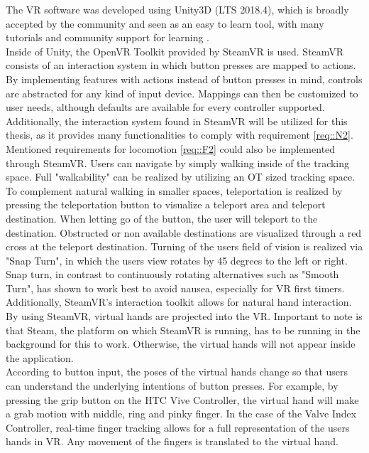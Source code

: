 The VR software was developed using Unity3D (LTS 2018.4), which is broadly accepted by the community and seen as an easy to learn tool, with many tutorials and community 
support for learning \cite{bartneck2015robot}.
\\ Inside of Unity, the OpenVR Toolkit provided by SteamVR is used.
SteamVR consists of an interaction system in which button presses are mapped to actions.
By implementing features with actions instead of button presses in mind, controls are abstracted for any kind of input device.
Mappings can then be customized to user needs, although defaults are available for every controller supported.
\\ Additionally, the interaction system found in SteamVR will be utilized for this thesis, as it provides many functionalities to comply with requirement \ref{req::N2}.
Mentioned requirements for locomotion \ref{req::F2} could also be implemented through SteamVR.
Users can navigate by simply walking inside of the tracking space.
Full "walkability" can be realized by utilizing an OT sized tracking space.
To complement natural walking in smaller spaces, teleportation is realized by pressing the teleportation button to visualize a teleport area and teleport destination.
When letting go of the button, the user will teleport to the destination.
Obstructed or non available destinations are visualized through a red cross at the teleport destination.
Turning of the users field of vision is realized via "Snap Turn", in which the users view rotates by 45 degrees to the left or right.
Snap turn, in contrast to continuously rotating alternatives such as "Smooth Turn", has shown to work best to avoid nausea, especially for VR first timers. 
\\ Additionally, SteamVR's interaction toolkit allows for natural hand interaction.
By using SteamVR, virtual hands are projected into the VR.
Important to note is that Steam, the platform on which SteamVR is running, has to be running in the background for this to work.
Otherwise, the virtual hands will not appear inside the application.
\\ According to button input, the poses of the virtual hands change so that users can understand the underlying intentions of button presses.
For example, by pressing the grip button on the HTC Vive Controller, the virtual hand will make a grab motion with middle, ring and pinky finger.
In the case of the Valve Index Controller, real-time finger tracking allows for a full representation of the users hands in VR.
Any movement of the fingers is translated to the virtual hand.
